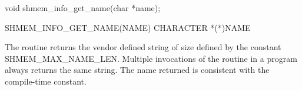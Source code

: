 \synC   %

void shmem_info_get_name(char *name); %

\synF   %

SHMEM_INFO_GET_NAME(NAME)   
CHARACTER *(*)NAME %

{
  The routine returns the vendor defined string of size defined by the 
  constant SHMEM\_MAX\_NAME\_LEN. Multiple invocations of the 
  routine in a \openshmem{} program always returns the same string. 
  The name returned is consistent with the compile-time constant.
}
{
}
\eAPI

